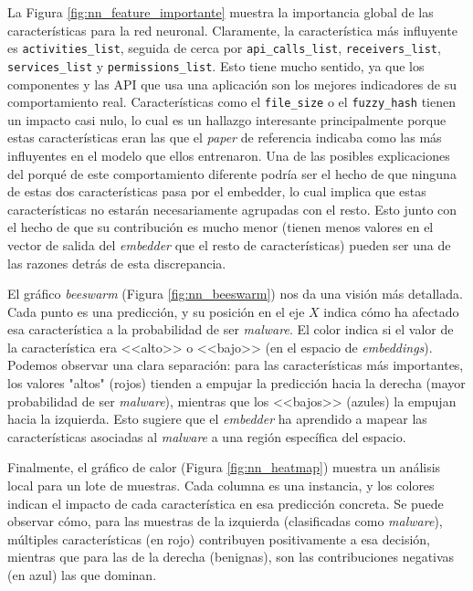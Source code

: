 La Figura \ref{fig:nn_feature_importante} muestra la importancia global de las características para la red neuronal. Claramente, la característica más influyente es \texttt{activities\_list}, seguida de cerca por \texttt{api\_calls\_list}, \texttt{receivers\_list}, \texttt{services\_list} y \texttt{permissions\_list}. Esto tiene mucho sentido, ya que los componentes y las API que usa una aplicación son los mejores indicadores de su comportamiento real. Características como el \texttt{file\_size} o el \texttt{fuzzy\_hash} tienen un impacto casi nulo, lo cual es un hallazgo interesante principalmente porque estas características eran las que el \textit{paper} de referencia indicaba como las más influyentes en el modelo que ellos entrenaron. Una de las posibles explicaciones del porqué de este comportamiento diferente podría ser el hecho de que ninguna de estas dos características pasa por el embedder, lo cual implica que estas características no estarán necesariamente agrupadas con el resto. Esto junto con el hecho de que su contribución es mucho menor (tienen menos valores en el vector de salida del \textit{embedder} que el resto de características) pueden ser una de las razones detrás de esta discrepancia.


El gráfico \textit{beeswarm} (Figura \ref{fig:nn_beeswarm}) nos da una visión más detallada. Cada punto es una predicción, y su posición en el eje $X$ indica cómo ha afectado esa característica a la probabilidad de ser \textit{malware}. El color indica si el valor de la característica era <<alto>> o <<bajo>> (en el espacio de \textit{embeddings}). Podemos observar una clara separación: para las características más importantes, los valores "altos" (rojos) tienden a empujar la predicción hacia la derecha (mayor probabilidad de ser \textit{malware}), mientras que los <<bajos>> (azules) la empujan hacia la izquierda. Esto sugiere que el \textit{embedder} ha aprendido a mapear las características asociadas al \textit{malware} a una región específica del espacio.


Finalmente, el gráfico de calor (Figura \ref{fig:nn_heatmap}) muestra un análisis local para un lote de muestras. Cada columna es una instancia, y los colores indican el impacto de cada característica en esa predicción concreta. Se puede observar cómo, para las muestras de la izquierda (clasificadas como \textit{malware}), múltiples características (en rojo) contribuyen positivamente a esa decisión, mientras que para las de la derecha (benignas), son las contribuciones negativas (en azul) las que dominan.


